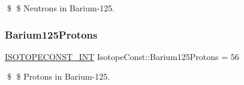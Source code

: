\$ \$ Neutrons in Barium-\/125. \mbox{\label{group___isotope_const-_barium-_ba125_gadd13e4102318766a0a1a9f78a5f01945}} 
\subsubsection{\texorpdfstring{Barium125\+Protons}{Barium125Protons}}
{\footnotesize\ttfamily \mbox{\hyperlink{group___isotope_const-_macros_ga5f18360b3e99483a35c32d789e62621c}{I\+S\+O\+T\+O\+P\+E\+C\+O\+N\+S\+T\+\_\+\+I\+NT}} Isotope\+Const\+::\+Barium125\+Protons = 56}

\$ \$ Protons in Barium-\/125. 